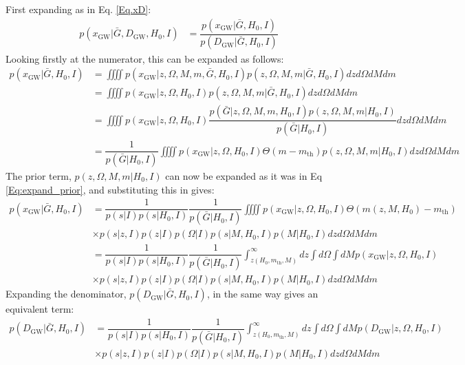 \documentclass[a4paper,10pt]{article}
\begin{document}
First expanding as in Eq. \ref{Eq.xD}:
\begin{equation}
\label{Eq:px_H0GbarD}
\begin{aligned}
p(x_{\text{GW}}|\bar{G},D_{\text{GW}},H_0,I) &= \dfrac{p(x_{\text{GW}}|\bar{G},H_0,I)}{p(D_{\text{GW}}|\bar{G},H_0,I)}
\end{aligned}
\end{equation}
Looking firstly at the numerator, this can be expanded as follows:
\begin{equation}
\begin{aligned}
p(x_{\text{GW}}|\bar{G},H_0,I) &= \iiiint p(x_{\text{GW}}|z,\Omega,M,m,\bar{G},H_0,I) p(z,\Omega,M,m|\bar{G},H_0,I) dz d\Omega dM dm
\\&= \iiiint p(x_{\text{GW}}|z,\Omega,H_0,I) p(z,\Omega,M,m|\bar{G},H_0,I) dz d\Omega dM dm
\\ &= \iiiint p(x_{\text{GW}}|z,\Omega,H_0,I) \dfrac{p(\bar{G}|z,\Omega,M,m,H_0,I)p(z,\Omega,M,m|H_0,I)}{p(\bar{G}|H_0,I)} dz d\Omega dM dm
\\ &= \dfrac{1}{p(\bar{G}|H_0,I)}\iiiint p(x_{\text{GW}}|z,\Omega,H_0,I) \Theta(m-m_{\text{th}})p(z,\Omega,M,m|H_0,I) dz d\Omega dM dm
\end{aligned}
\end{equation}
The prior term, $p(z,\Omega,M,m|H_0,I)$ can now be expanded as it was in Eq \ref{Eq:expand_prior}, and substituting this in gives:
\begin{equation}
\begin{aligned}
p(x_{\text{GW}}|\bar{G},H_0,I) &=\dfrac{1}{p(s|I)p(s|H_0,I)} \dfrac{1}{p(\bar{G}|H_0,I)}\iiiint p(x_{\text{GW}}|z,\Omega,H_0,I) \Theta(m(z,M,H_0)-m_{\text{th}}) \\&\times p(s|z,I)p(z|I)p(\Omega|I)p(s|M,H_0,I)p(M|H_0,I) dz d\Omega dM dm
\\&=\dfrac{1}{p(s|I)p(s|H_0,I)} \dfrac{1}{p(\bar{G}|H_0,I)}\int^\infty_{z(H_0,m_{\text{th}},M)}dz \int d\Omega \int dM p(x_{\text{GW}}|z,\Omega,H_0,I) \\&\times p(s|z,I)p(z|I)p(\Omega|I)p(s|M,H_0,I)p(M|H_0,I) dz d\Omega dM dm
\end{aligned}
\end{equation}
Expanding the denominator, $p(D_{\text{GW}}|\bar{G},H_0,I)$, in the same way gives an equivalent term:
\begin{equation}
\begin{aligned}
p(D_{\text{GW}}|\bar{G},H_0,I) &=\dfrac{1}{p(s|I)p(s|H_0,I)} \dfrac{1}{p(\bar{G}|H_0,I)}\int^\infty_{z(H_0,m_{\text{th}},M)}dz \int d\Omega \int dM p(D_{\text{GW}}|z,\Omega,H_0,I) \\&\times p(s|z,I)p(z|I)p(\Omega|I)p(s|M,H_0,I)p(M|H_0,I) dz d\Omega dM dm
\end{aligned}
\end{equation}
\end{document}
